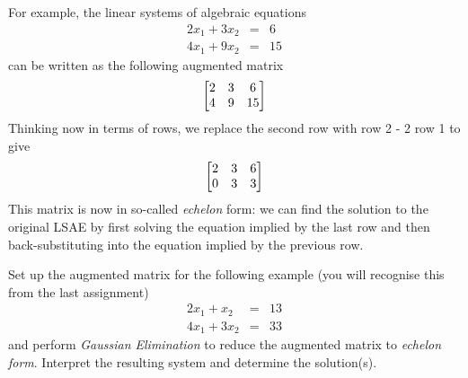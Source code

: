 For example, the linear systems of algebraic equations
\begin{eqnarray*}
2 x_1 + 3 x_2 &=& 6 \\
4 x_1 + 9 x_2 &=& 15
\end{eqnarray*}
can be written as the following augmented matrix 
\[ \begin{bmatrix} 2 & 3 & 6 \\ 4 & 9 & 15 \end{bmatrix} \]
Thinking now in terms of rows, we replace the second row with row 2 - 2 row 1 to give
\[ \begin{bmatrix} 2 & 3 & 6 \\ 0 & 3 & 3 \end{bmatrix} \]
This matrix is now in so-called \textit{echelon} form: we can find the solution to the original LSAE by first solving the equation implied by the last row and then back-substituting into the equation implied by the previous row. 

\begin{prob}
\be
\item Set up the augmented matrix for the following example (you will recognise this from the last assignment)
\begin{eqnarray*}
2x_1 + x_2 &=& 13 \\
4x_1 + 3x_2 &=& 33
\end{eqnarray*}
and perform \textit{Gaussian Elimination} to reduce the augmented matrix to \textit{echelon form}. Interpret the resulting system and determine the solution(s).
\ee
\end{prob}





